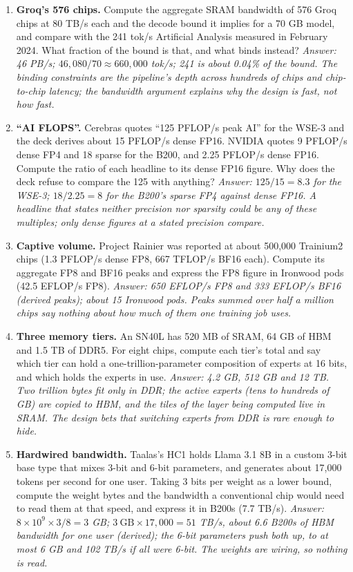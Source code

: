 \documentclass[11pt,letterpaper]{article}
\begin{document}
\begin{enumerate}[leftmargin=1.6em,itemsep=6pt]
\item \textbf{Groq's 576 chips.} Compute the aggregate SRAM bandwidth of 576 Groq chips at 80 TB/s each and the decode bound it implies for a 70 GB model, and compare with the 241 tok/s Artificial Analysis measured in February 2024. What fraction of the bound is that, and what binds instead? \emph{Answer: 46 PB/s; $46{,}080/70 \approx 660{,}000$ tok/s; 241 is about 0.04\% of the bound. The binding constraints are the pipeline's depth across hundreds of chips and chip-to-chip latency; the bandwidth argument explains why the design is fast, not how fast.}
\item \textbf{``AI FLOPS''.} Cerebras quotes ``125 PFLOP/s peak AI'' for the WSE-3 and the deck derives about 15 PFLOP/s dense FP16. NVIDIA quotes 9 PFLOP/s dense FP4 and 18 sparse for the B200, and 2.25 PFLOP/s dense FP16. Compute the ratio of each headline to its dense FP16 figure. Why does the deck refuse to compare the 125 with anything? \emph{Answer: $125/15 = 8.3$ for the WSE-3; $18/2.25 = 8$ for the B200's sparse FP4 against dense FP16. A headline that states neither precision nor sparsity could be any of these multiples; only dense figures at a stated precision compare.}
\item \textbf{Captive volume.} Project Rainier was reported at about 500{,}000 Trainium2 chips (1.3 PFLOP/s dense FP8, 667 TFLOP/s BF16 each). Compute its aggregate FP8 and BF16 peaks and express the FP8 figure in Ironwood pods (42.5 EFLOP/s FP8). \emph{Answer: 650 EFLOP/s FP8 and 333 EFLOP/s BF16 (derived peaks); about 15 Ironwood pods. Peaks summed over half a million chips say nothing about how much of them one training job uses.}
\item \textbf{Three memory tiers.} An SN40L has 520 MB of SRAM, 64 GB of HBM and 1.5 TB of DDR5. For eight chips, compute each tier's total and say which tier can hold a one-trillion-parameter composition of experts at 16 bits, and which holds the experts in use. \emph{Answer: 4.2 GB, 512 GB and 12 TB. Two trillion bytes fit only in DDR; the active experts (tens to hundreds of GB) are copied to HBM, and the tiles of the layer being computed live in SRAM. The design bets that switching experts from DDR is rare enough to hide.}
\item \textbf{Hardwired bandwidth.} Taalas's HC1 holds Llama 3.1 8B in a custom 3-bit base type that mixes 3-bit and 6-bit parameters, and generates about 17{,}000 tokens per second for one user. Taking 3 bits per weight as a lower bound, compute the weight bytes and the bandwidth a conventional chip would need to read them at that speed, and express it in B200s (7.7 TB/s). \emph{Answer: $8\times10^9\times3/8 = 3$ GB; $3\ \mathrm{GB}\times17{,}000 = 51$ TB/s, about 6.6 B200s of HBM bandwidth for one user (derived); the 6-bit parameters push both up, to at most 6 GB and 102 TB/s if all were 6-bit. The weights are wiring, so nothing is read.}

\end{enumerate}
\end{document}
